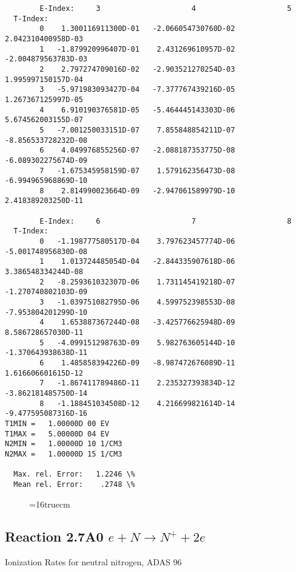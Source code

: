 \documentclass[12pt,dvipdfmx]{article}
\begin{document}
{\begin{small}
\begin{verbatim}
        E-Index:     3                     4                     5
  T-Index:
        0    1.300116911300D-01   -2.066054730760D-02    2.042310400958D-03
        1   -1.879920996407D-01    2.431269610957D-02   -2.004879563783D-03
        2    2.797274709016D-02   -2.903521270254D-03    1.995997150157D-04
        3   -5.971983093427D-04   -7.377767439216D-05    1.267367125997D-05
        4    6.910190376581D-05   -5.464445143303D-06    5.674562003155D-07
        5   -7.001250033151D-07    7.855848854211D-07   -8.856533728232D-08
        6    4.049976855256D-07   -2.088187353775D-08   -6.089302275674D-09
        7   -1.675345958159D-07    1.579162356473D-08   -6.994965968869D-10
        8    2.814990023664D-09   -2.947061589979D-10    2.418389203250D-11

        E-Index:     6                     7                     8
  T-Index:
        0   -1.198777580517D-04    3.797623457774D-06   -5.001748956830D-08
        1    1.013724485054D-04   -2.844335907618D-06    3.386548334244D-08
        2   -8.259361032307D-06    1.731145419218D-07   -1.270740802103D-09
        3   -1.039751082795D-06    4.599752398553D-08   -7.953804201299D-10
        4    1.653887367244D-08   -3.425776625948D-09    8.586728657030D-11
        5   -4.099151298763D-09    5.982763605144D-10   -1.370643938638D-11
        6    1.485858394226D-09   -8.987472676089D-11    1.616606601615D-12
        7   -1.867411789486D-11    2.235327393834D-12   -3.862181485750D-14
        8   -1.188451034508D-12    4.216699821614D-14   -9.477595087316D-16
T1MIN =   1.00000D 00 EV
T1MAX =   5.00000D 04 EV
N2MIN =   1.00000D 10 1/CM3
N2MAX =   1.00000D 15 1/CM3

  Max. rel. Error:   1.2246 \%
  Mean rel. Error:    .2748 \%
\end{verbatim}\end{small}
\begin{figure} \label{2.6A0}
\epsfxsize=16truecm
\end{figure}
\newpage

\subsection{
Reaction 2.7A0 $e + N \rightarrow N^+  + 2e $ }
  Ionization Rates for neutral  nitrogen,   ADAS 96

}
\end{document}
